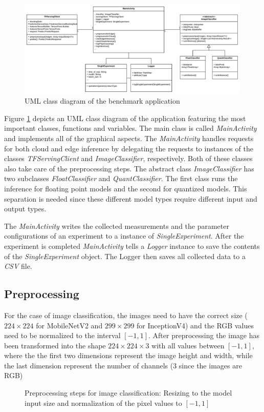 \begin{figure}[htb]
\centering
\includegraphics[width=0.99\textwidth]{./Bilder/UML.pdf}
\caption{UML class diagram of the benchmark application}
\label{fig:UML}
\end{figure}
Figure \ref{fig:UML} depicts an UML class diagram of the application featuring the most important classes, functions and variables. 
The main class is called \emph{MainActivity} and implements all of the graphical aspects. 
The \emph{MainActivity} handles requests for both cloud and edge inference by delegating the requests to instances of the classes \emph{TFServingClient} and \emph{ImageClassifier}, respectively. Both of these classes also take care of the preprocessing steps.
The abstract class \emph{ImageClassifier} has two subclasses \emph{FloatClassifier} and \emph{QuantClassifier}. The first class runs the inference for floating point models and the second for quantized models.
This separation is needed since these different model types require different input and output types.

The \emph{MainActivity} writes the collected measurements and the parameter configurations of an experiment to a instance of \emph{SingleExperiment}. After the experiment is completed \emph{MainActivity} tells a \emph{Logger} instance to save the contents of the \emph{SingleExperiment} object. The Logger then saves all collected data to a \emph{CSV} file.

\subsection{Preprocessing}
For the case of image classification, the images need to have the correct size ($224\times224$ for MobileNetV2 and $299\times299$ for InceptionV4) and the RGB values need to be normalized to the interval $[-1,1]$. After preprocessing the image has been transformed into the shape $224\times224\times3$ with all values between $[-1,1]$, where the the first two dimensions represent the image height and width, while the last dimension represent the number of channels (3 since the images are RGB)
\begin{figure}[H]
\centering

\caption{Preprocessing steps for image classification: Resizing to the model input size and normalization of the pixel values to $[-1,1]$}
\label{fig:prepro}
\end{figure}
